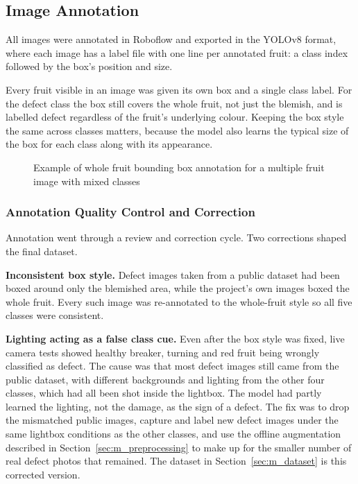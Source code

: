 \subsection{Image Annotation}
\label{sec:m_annotation}

All images were annotated in Roboflow \citep{dwyer2024} and exported in the YOLOv8 format, where each image has a label file with one line per annotated fruit: a class index followed by the box's position and size.

Every fruit visible in an image was given its own box and a single class label. For the defect class the box still covers the whole fruit, not just the blemish, and is labelled defect regardless of the fruit's underlying colour. Keeping the box style the same across classes matters, because the model also learns the typical size of the box for each class along with its appearance.

\begin{figure}[H]
\centering
{}
\caption{Example of whole fruit bounding box annotation for a multiple fruit image with mixed classes}
\label{fig:annotation}
\end{figure}

\subsubsection{Annotation Quality Control and Correction}
\label{sec:annotation_qc}

Annotation went through a review and correction cycle. Two corrections shaped the final dataset.

\textbf{Inconsistent box style.} Defect images taken from a public dataset had been boxed around only the blemished area, while the project's own images boxed the whole fruit. Every such image was re-annotated to the whole-fruit style so all five classes were consistent.

\textbf{Lighting acting as a false class cue.} Even after the box style was fixed, live camera tests showed healthy breaker, turning and red fruit being wrongly classified as defect. The cause was that most defect images still came from the public dataset, with different backgrounds and lighting from the other four classes, which had all been shot inside the lightbox. The model had partly learned the lighting, not the damage, as the sign of a defect. The fix was to drop the mismatched public images, capture and label new defect images under the same lightbox conditions as the other classes, and use the offline augmentation described in Section~\ref{sec:m_preprocessing} to make up for the smaller number of real defect photos that remained. The dataset in Section~\ref{sec:m_dataset} is this corrected version.

